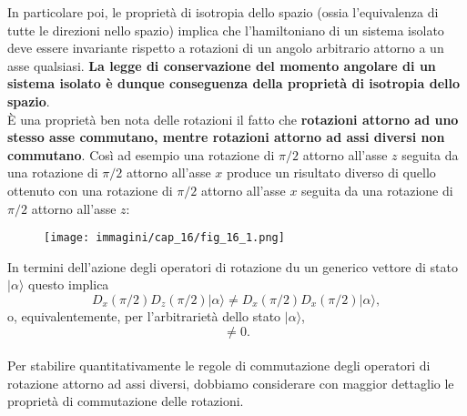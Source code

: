 In particolare poi, le proprietà di isotropia dello spazio (ossia l'equivalenza di tutte le direzioni nello spazio) implica che l'hamiltoniano di un sistema isolato deve essere invariante rispetto a rotazioni di un angolo arbitrario attorno a un asse qualsiasi. \textbf{La legge di conservazione del momento angolare di un sistema isolato è dunque conseguenza della proprietà di isotropia dello spazio}.\\

È una proprietà ben nota delle rotazioni il fatto che \textbf{rotazioni attorno ad uno stesso asse commutano, mentre rotazioni attorno ad assi diversi non commutano}. Così ad esempio una rotazione di $\pi /2$ attorno all'asse $z$ seguita da una rotazione di $\pi /2$ attorno all'asse $x$ produce un risultato diverso di quello ottenuto con una rotazione di $\pi /2$ attorno all'asse $x$ seguita da una rotazione di $\pi /2$ attorno all'asse $z$:\\
\begin{figure}[!htbp]
\begin{center}
\texttt{[image: immagini/cap\_16/fig\_16\_1.png]}
\end{center}
\end{figure}


In termini dell'azione degli operatori di rotazione du un generico vettore di stato $\vert \alpha \rangle$ questo implica
	\begin{equation}
		D_x (\pi/2) D_z (\pi/2) \vert \alpha \rangle \neq D_x (\pi/2) D_x (\pi/2) \vert \alpha \rangle ,
	\end{equation}
o, equivalentemente, per l'arbitrarietà dello stato $\vert \alpha \rangle$,
\begin{equation}
[D_x (\pi/2); D_z (\pi/2)] \neq 0 .
\end{equation}\\

Per stabilire quantitativamente le regole di commutazione degli operatori di rotazione attorno ad assi diversi, dobbiamo considerare con maggior dettaglio le proprietà di commutazione delle rotazioni.\\


